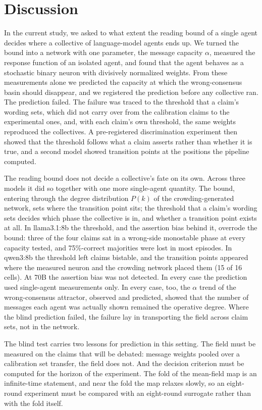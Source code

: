 \documentclass{ieeeaccess}
\begin{document}
\section{Discussion}\label{sec:discussion}

In the current study, we asked to what extent the reading bound of a
single agent decides where a collective of language-model agents ends up.
We turned the bound into a network with one parameter, the message
capacity $\alpha$, measured the response function of an isolated agent, and
found that the agent behaves as a stochastic binary neuron with divisively
normalized weights. From these measurements alone we predicted the
capacity at which the wrong-consensus basin should disappear, and we
registered the prediction before any collective ran. The prediction
failed. The failure was traced to the threshold that a claim's wording
sets, which did not carry over from the calibration claims to the
experimental ones, and, with each claim's own threshold, the same weights
reproduced the collectives. A pre-registered discrimination experiment then
showed that the threshold follows what a claim asserts rather than whether
it is true, and a second model showed transition points at the positions
the pipeline computed.

The reading bound does not decide a collective's fate on its own. Across
three models it did so together with one more single-agent quantity. The
bound, entering through the degree distribution $P(k)$ of the
crowding-generated network, sets where the transition point sits; the
threshold that a claim's wording sets decides which phase the collective is
in, and whether a transition point exists at all. In llama3.1:8b the
threshold, and the assertion bias behind it, overrode the bound: three of
the four claims sat in a wrong-side monostable phase at every capacity
tested, and 75\%-correct majorities were lost in most episodes. In qwen3:8b
the threshold left claims bistable, and the transition points appeared
where the measured neuron and the crowding network placed them (15 of 16
cells). At 70B the assertion bias was not detected. In every case the
prediction used single-agent measurements only. In every case, too, the
$\alpha$ trend of the wrong-consensus attractor, observed and predicted,
showed that the number of messages each agent was actually shown remained
the operative degree. Where the blind prediction failed, the failure lay
in transporting the field across claim sets, not in the network.

The blind test carries two lessons for prediction in this setting. The
field must be measured on the claims that will be debated: message weights
pooled over a calibration set transfer, the field does not. And the
decision criterion must be computed for the horizon of the experiment. The
fold of the mean-field map is an infinite-time statement, and near the fold
the map relaxes slowly, so an eight-round experiment must be compared with
an eight-round surrogate rather than with the fold itself.
\end{document}
